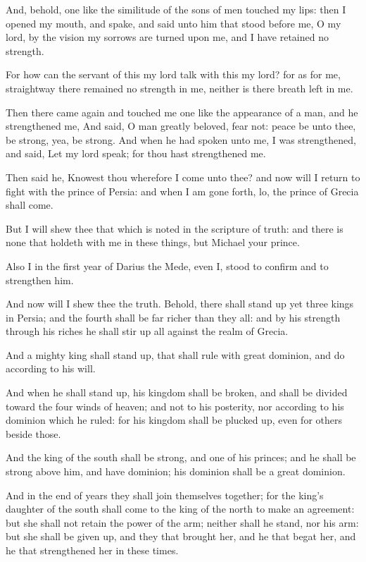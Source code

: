 \Verse And, behold, one like the similitude of the sons of men touched my lips: then I opened my mouth, and spake, and said unto him that stood before me, O my lord, by the vision my sorrows are turned upon me, and I have retained no strength.

\Verse For how can the servant of this my lord talk with this my lord?  for as for me, straightway there remained no strength in me, neither is there breath left in me.

\Verse Then there came again and touched me one like the appearance of a man, and he strengthened me, \Verse And said, O man greatly beloved, fear not: peace be unto thee, be strong, yea, be strong. And when he had spoken unto me, I was strengthened, and said, Let my lord speak; for thou hast strengthened me.

\Verse Then said he, Knowest thou wherefore I come unto thee? and now will I return to fight with the prince of Persia: and when I am gone forth, lo, the prince of Grecia shall come.

\Verse But I will shew thee that which is noted in the scripture of truth: and there is none that holdeth with me in these things, but Michael your prince.


\Chapter
\Verse Also I in the first year of Darius the Mede, even I, stood to confirm and to strengthen him.

\Verse And now will I shew thee the truth. Behold, there shall stand up yet three kings in Persia; and the fourth shall be far richer than they all: and by his strength through his riches he shall stir up all against the realm of Grecia.

\Verse And a mighty king shall stand up, that shall rule with great dominion, and do according to his will.

\Verse And when he shall stand up, his kingdom shall be broken, and shall be divided toward the four winds of heaven; and not to his posterity, nor according to his dominion which he ruled: for his kingdom shall be plucked up, even for others beside those.

\Verse And the king of the south shall be strong, and one of his princes; and he shall be strong above him, and have dominion; his dominion shall be a great dominion.

\Verse And in the end of years they shall join themselves together; for the king's daughter of the south shall come to the king of the north to make an agreement: but she shall not retain the power of the arm; neither shall he stand, nor his arm: but she shall be given up, and they that brought her, and he that begat her, and he that strengthened her in these times.

